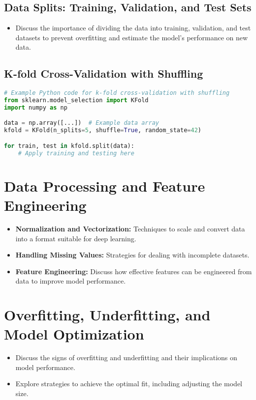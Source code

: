 \subsection{Data Splits: Training, Validation, and Test Sets}
\begin{itemize}
    \item Discuss the importance of dividing the data into training, validation, and test datasets to prevent overfitting and estimate the model's performance on new data.
\end{itemize}

\subsection{K-fold Cross-Validation with Shuffling}
\begin{lstlisting}[language=Python]
# Example Python code for k-fold cross-validation with shuffling
from sklearn.model_selection import KFold
import numpy as np

data = np.array([...])  # Example data array
kfold = KFold(n_splits=5, shuffle=True, random_state=42)

for train, test in kfold.split(data):
    # Apply training and testing here
\end{lstlisting}

\section{Data Processing and Feature Engineering}
\begin{itemize}
    \item \textbf{Normalization and Vectorization:} Techniques to scale and convert data into a format suitable for deep learning.
    \item \textbf{Handling Missing Values:} Strategies for dealing with incomplete datasets.
    \item \textbf{Feature Engineering:} Discuss how effective features can be engineered from data to improve model performance.
\end{itemize}

\section{Overfitting, Underfitting, and Model Optimization}
\begin{itemize}
    \item Discuss the signs of overfitting and underfitting and their implications on model performance.
    \item Explore strategies to achieve the optimal fit, including adjusting the model size.
\end{itemize}

